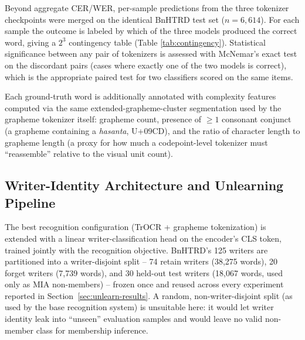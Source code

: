 \documentclass[a4paper,fleqn]{cas-dc}
\begin{document}
Beyond aggregate CER/WER, per-sample predictions from the three tokenizer
checkpoints were merged on the identical BnHTRD test set
($n=6{,}614$). For each sample the outcome is labeled by which of the three
models produced the correct word, giving a $2^3$ contingency table (Table
\ref{tab:contingency}). Statistical significance between any pair of
tokenizers is assessed with McNemar's exact test on the discordant pairs
(cases where exactly one of the two models is correct), which is the
appropriate paired test for two classifiers scored on the same items.

Each ground-truth word is additionally annotated with complexity features
computed via the same extended-grapheme-cluster segmentation used by the
grapheme tokenizer itself: grapheme count, presence of $\geq 1$ consonant
conjunct (a grapheme containing a \textit{hasanta}, U+09CD), and the ratio
of character length to grapheme length (a proxy for how much a
codepoint-level tokenizer must ``reassemble'' relative to the visual unit
count).

\subsection{Writer-Identity Architecture and Unlearning Pipeline}
\label{sec:unlearn-pipeline}

The best recognition configuration (TrOCR + grapheme tokenization) is
extended with a linear writer-classification head on the encoder's CLS
token, trained jointly with the recognition objective. BnHTRD's 125
writers are partitioned into a writer-disjoint split -- 74 retain writers
(38{,}275 words), 20 forget writers (7{,}739 words), and 30 held-out test
writers (18{,}067 words, used only as MIA non-members) -- frozen once and
reused across every experiment reported in Section~\ref{sec:unlearn-results}.
A random, non-writer-disjoint split (as used by the base recognition
system) is unsuitable here: it would let writer identity leak into
``unseen'' evaluation samples and would leave no valid non-member class for
membership inference.
\end{document}
